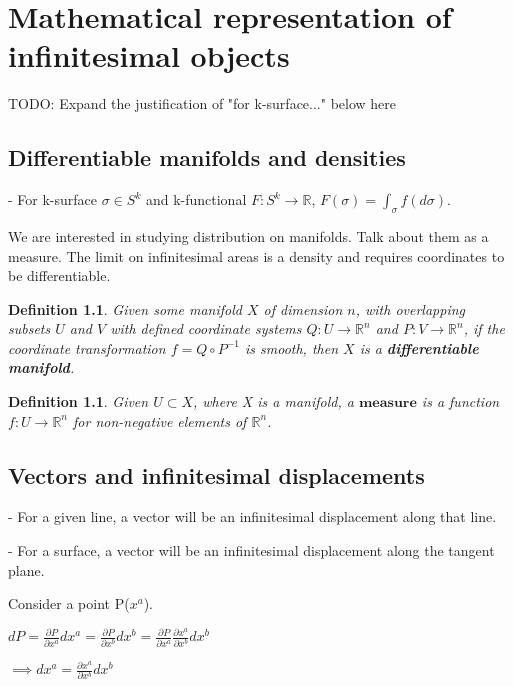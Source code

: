 \documentclass{book}
\newtheorem{defn}[equation]{Definition}
\begin{document}
\chapter{Mathematical representation of infinitesimal objects}

TODO: Expand the justification of "for k-surface..." below here

\section{Differentiable manifolds and densities}


- For k-surface $\sigma \in S^k$ and k-functional $F: S^k \to \mathbb{R}$, $F(\sigma) = \int_{\sigma}f(d\sigma)$. 

We are interested in studying distribution on manifolds. Talk about them as a measure. The limit on infinitesimal areas is a density and requires coordinates to be differentiable.


\begin{defn}
	Given some manifold $X$ of dimension $n$, with overlapping subsets $U$ and $V$ with defined coordinate systems $Q: U \to \mathbb{R}^n$ and $P: V \to \mathbb{R}^n$, if the coordinate transformation $f = Q \circ P^{-1}$ is smooth, then $X$ is a \textbf{differentiable manifold}. 
\end{defn}

\begin{defn}
	Given $U \subset X$, where X is a manifold, a $\textbf{measure}$ is a function $f : U \to \mathbb{R}^n$ for non-negative elements of $\mathbb{R}^n$. 
\end{defn}




\section{Vectors and infinitesimal displacements}

- For a given line, a vector will be an infinitesimal displacement along that line. 

- For a surface, a vector will be an infinitesimal displacement along the tangent plane. 


Consider a point P($x^a$).
 
$dP = \frac{\partial P}{\partial x^a} dx^a = \frac{\partial P}{\partial x^b} dx^b = \frac{\partial P}{\partial x^a}\frac{\partial x^a}{\partial x^b} dx^b$

$\implies dx^a = \frac{\partial x^a}{\partial x^b}dx^b $
\end{document}
